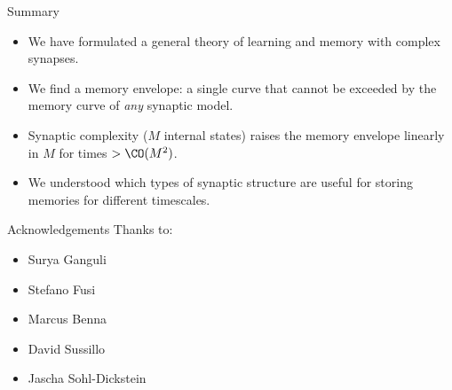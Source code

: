 \documentclass{beamer}%
\begin{document}
\begin{frame}{Summary}
%
  \begin{itemize}
    \item We have formulated a general theory of learning and memory with complex synapses.
    \vp\item We find a memory envelope: a single curve that cannot be exceeded by the memory curve of \emph{any} synaptic model.
    \vp\item Synaptic complexity ($M$ internal states) raises the memory envelope linearly in $M$ for times $> \CO(M^2)$.
    \vp\item We understood which types of synaptic structure are useful for storing memories for different timescales.
  \end{itemize}

%
\end{frame}





%
%
%

\begin{frame}{Acknowledgements}
%
 Thanks to:
 \begin{itemize}
   \item Surya Ganguli
   \item Stefano Fusi
   \item Marcus Benna
   \item David Sussillo
   \item Jascha Sohl-Dickstein
 \end{itemize}
%
\end{frame}

\appendix
\end{document}
